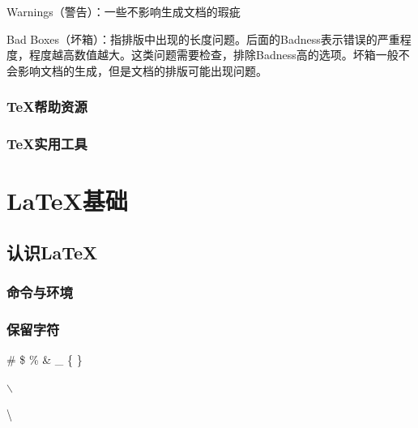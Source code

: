 \documentclass{ctexart}
\begin{document}
            Warnings（警告）：一些不影响生成文档的瑕疵

            Bad Boxes（坏箱）：指排版中出现的长度问题。后面的Badness表示错误的严重程度，程度越高数值越大。这类问题需要检查，排除Badness高的选项。坏箱一般不会影响文档的生成，但是文档的排版可能出现问题。

        \subsubsection{\TeX 帮助资源}
        \subsubsection{\TeX 实用工具}

\section{\LaTeX 基础}
    \subsection{认识\LaTeX}
        \subsubsection{命令与环境}
        \subsubsection{保留字符}
            \# 
            \$ 
            \% 
            \& 
            \_ 
            \{ 
            \} 

            $\backslash$

            \textbackslash

            \textrm{}
\end{document}
